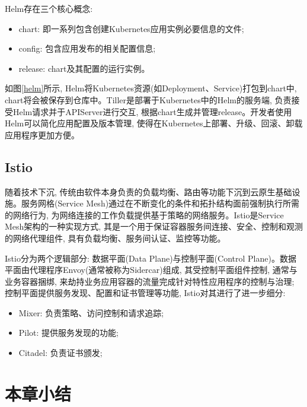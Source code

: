 Helm存在三个核心概念:

\begin{itemize}[itemindent=2em]
    \item chart: 即一系列包含创建Kubernetes应用实例必要信息的文件;

    \item config: 包含应用发布的相关配置信息;

    \item release: chart及其配置的运行实例。
\end{itemize}

如图\ref{helm}所示, Helm将Kubernetes资源(如Deployment、Service)打包到chart中, chart将会被保存到仓库中。Tiller是部署于Kubernetes中的Helm的服务端, 负责接受Helm请求并于APIServer进行交互, 根据chart生成并管理release。开发者使用Helm可以简化应用配置及版本管理, 使得在Kubernetes上部署、升级、回滚、卸载应用程序更加方便。

\subsection{Istio}

随着技术下沉, 传统由软件本身负责的负载均衡、路由等功能下沉到云原生基础设施。服务网格(Service Mesh)通过在不断变化的条件和拓扑结构面前强制执行所需的网络行为, 为网络连接的工作负载提供基于策略的网络服务\cite{calcote2019istio}。Istio\footnotemark[1]是Service Mesh架构的一种实现方式, 其是一个用于保证容器服务间连接、安全、控制和观测的网络代理组件, 具有负载均衡、服务间认证、监控等功能。

Istio分为两个逻辑部分\cite{larsson2020impact}: 数据平面(Data Plane)与控制平面(Control Plane)。数据平面由代理程序Envoy(通常被称为Sidercar)组成, 其受控制平面组件控制, 通常与业务容器捆绑, 来劫持业务应用容器的流量完成针对特性应用程序的控制与治理; 控制平面提供服务发现、配置和证书管理等功能, Istio对其进行了进一步细分:

\begin{itemize}[itemindent=2em]
    \item Mixer: 负责策略、访问控制和请求追踪;

    \item Pilot: 提供服务发现的功能;

    \item Citadel: 负责证书颁发;
\end{itemize}

\section{本章小结}

